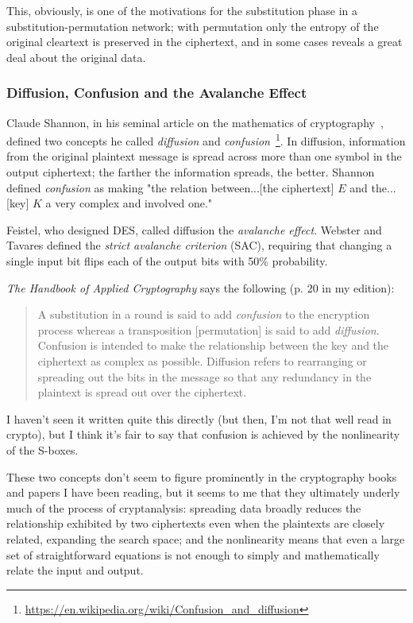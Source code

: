 \documentclass[%
 aip,
 jmp,%
 amsmath,amssymb,
 reprint,%
]{revtex4-1}
\begin{document}
This, obviously, is one of the motivations for the substitution phase
in a substitution-permutation network; with permutation only the
entropy of the original cleartext is preserved in the ciphertext, and
in some cases reveals a great deal about the original data.

\subsubsection{Diffusion, Confusion and the Avalanche Effect}
\label{sec:diffusion}

Claude Shannon, in his seminal article on the mathematics of
cryptography~\cite{shannon45}, defined two concepts he called
\emph{diffusion} and \emph{confusion}~\footnote{\url{https://en.wikipedia.org/wiki/Confusion_and_diffusion}}.  In diffusion, information from
the original plaintext message is spread across more than one symbol
in the output ciphertext; the farther the information spreads, the
better.  Shannon defined \emph{confusion} as making "the relation
between...[the ciphertext] $E$ and the...[key] $K$ a very complex and
involved one."

Feistel, who designed DES, called diffusion the \emph{avalanche effect}.
Webster and Tavares defined the \emph{strict avalanche criterion} (SAC),
requiring that changing a single input bit flips each of the output
bits with 50\% probability.

\emph{The Handbook of Applied Cryptography} says the following (p. 20 in my
edition):

\begin{quote}
A substitution in a round is said to add \emph{confusion} to the
encryption process whereas a transposition [permutation] is said to
add \emph{diffusion}. Confusion is intended to make the relationship
between the key and the ciphertext as complex as possible.  Diffusion
refers to rearranging or spreading out the bits in the message so that
any redundancy in the plaintext is spread out over the ciphertext.
\end{quote}

I haven't seen it written quite this directly (but then, I'm not that
well read in crypto), but I think it's fair to say that confusion is
achieved by the nonlinearity of the S-boxes.

These two concepts don't seem to figure prominently in the
cryptography books and papers I have been reading, but it seems to me
that they ultimately underly much of the process of cryptanalysis:
spreading data broadly reduces the relationship exhibited by two
ciphertexts even when the plaintexts are closely related, expanding
the search space; and the nonlinearity means that even a large set of
straightforward equations is not enough to simply and mathematically
relate the input and output.
\end{document}
